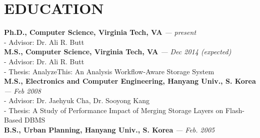 \section{EDUCATION}
\vspace{0.07in} 
{\bf Ph.D., Computer Science, Virginia Tech, VA}
{\footnotesize{\it --- present}} \\
  - {\small Advisor: Dr. Ali R. Butt}
\vspace{0.03in}\\
{\bf M.S., Computer Science, Virginia Tech, VA}
{\footnotesize{\it --- Dec 2014 (expected)}} \\
  - {\small Advisor: Dr. Ali R. Butt} \\
  - {\small Thesis: AnalyzeThis: An Analysis Workflow-Aware Storage System}
\vspace{0.03in}\\
{\bf M.S., Electronics and Computer Engineering, Hanyang Univ., S. Korea}
{\footnotesize{\it --- Feb 2008}}\\
  - {\small Advisor: Dr. Jaehyuk Cha, Dr. Sooyong Kang}\\
  - {\small Thesis: A Study of Performance Impact of Merging Storage Layers on
  Flash-Based DBMS}
\vspace{0.03in}\\
{\bf B.S., Urban Planning, Hanyang Univ., S. Korea}
{\footnotesize{\it --- Feb. 2005}}

